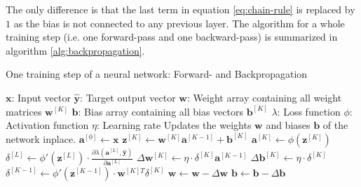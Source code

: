 The only difference is that the last term in equation \ref{eq:chain-rule} is replaced by $1$ as the bias is not connected to any previous layer.
The algorithm for a whole training step (i.e. one forward-pass and one backward-pass) is summarized in algorithm \ref{alg:backpropagation}.
\begin{algorithm}
    \caption{One training step of a neural network: Forward- and Backpropagation}
    \label{alg:backpropagation}
    \begin{algorithmic}[1]
        \renewcommand{\algorithmicensure}{\textbf{Output:}}
        \Require
            \Statex $\bm{x}$: Input vector
            \Statex $\bm{\hat{y}}$: Target output vector
            \Statex $\bm{w}$: Weight array containing all weight matrices $\bm{w}^{[K]}$
            \Statex $\bm{b}$: Bias array containing all bias vectors $\bm{b}^{[K]}$
            \Statex $\lambda$: Loss function
            \Statex $\phi$: Activation function
            \Statex $\eta$: Learning rate
        \Ensure Updates the weights $\bm{w}$ and biases $\bm{b}$ of the network inplace.
        \Statex
        \State $\bm{a}^{[0]} \gets \bm{x}$ 
         
            \State $\bm{z}^{[K]} \gets \bm{w}^{[K]} \bm{a}^{[K-1]} + \bm{b}^{[K]}$ 
            \State $\bm{a}^{[K]} \gets \phi(\bm{z}^{[K]})$ 
        \EndFor
        \State $\delta^{[L]} \gets \phi'(\bm{z}^{[L]}) \cdot \frac{\partial \lambda(\bm{a}^{[L]}, \bm{\hat{y}})}{\partial \bm{a}^{[L]}}$ 
         
            \State $\Delta \bm{w}^{[K]} \gets \eta \cdot \delta^{[K]} \bm{a}^{[K-1]}$ 
            \State $\Delta \bm{b}^{[K]} \gets \eta \cdot \delta^{[K]}$ 
            \State $\delta^{[K-1]} \gets \phi'(\bm{z}^{[K-1]}) \cdot \bm{w}^{[K]T} \delta^{[K]}$ 
        \EndFor
        \State $\bm{w} \gets \bm{w} - \Delta \bm{w}$ 
        \State $\bm{b} \gets \bm{b} - \Delta \bm{b}$ 
    \end{algorithmic}
\end{algorithm}

